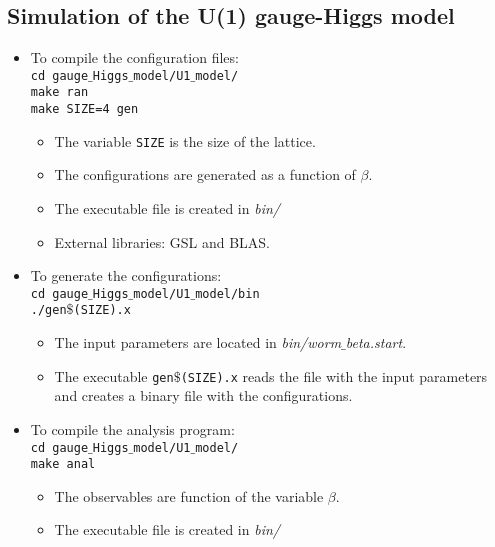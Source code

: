 \documentclass[a4paper,10pt]{report}
\begin{document}
\subsection*{Simulation of the U(1) gauge-Higgs model}
\begin{itemize}[leftmargin=*]
 \item To compile the configuration files:
 \vspace*{2mm}
 \texttt{
 \\cd gauge$\_$Higgs$\_$model/U1$\_$model/
 \\make ran   
 \\make SIZE=4 gen
 }

 \begin{itemize}[leftmargin=*]
  \item The variable {\tt SIZE} is the size of the lattice.
  \item The configurations are generated as a function of $\beta$.
  \item The executable file is created in {\it bin/}
  \item External libraries: GSL and BLAS.
 \end{itemize}
 
 \item To generate the configurations:
 \vspace*{2mm}
 \texttt{
 \\cd gauge$\_$Higgs$\_$model/U1$\_$model/bin
 \\./gen$\$$(SIZE).x   
 }

 \begin{itemize}[leftmargin=*]
  \item The input parameters are located in {\it bin/worm$\_$beta.start}.
  \item The executable {\tt gen$\$$(SIZE).x} reads the file with the input parameters and creates
  a binary file with the configurations.
 \end{itemize}
 
 

 \item To compile the analysis program:
 \vspace*{2mm}
 \texttt{
 \\cd gauge$\_$Higgs$\_$model/U1$\_$model/
 \\make anal
 }

 \begin{itemize}[leftmargin=*]
  \item The observables are function of the variable $\beta$.
  \item The executable file is created in {\it bin/}
 \end{itemize}
 

\end{itemize}
\end{document}
